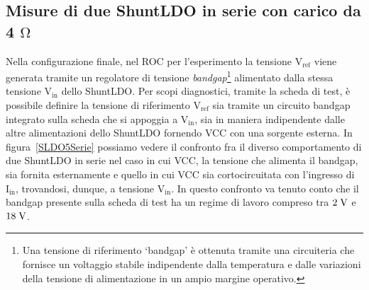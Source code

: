 \subsection{Misure di due ShuntLDO in serie con carico da 4 $\mathrm{\Omega}$}

Nella configurazione finale, nel ROC per l'esperimento la tensione $\mathrm{V_{ref}}$ viene generata tramite un regolatore di tensione {\em bandgap}\footnote{Una tensione di riferimento `bandgap' \`e ottenuta tramite una circuiteria che fornisce un voltaggio stabile indipendente dalla temperatura e dalle variazioni della tensione di alimentazione in un ampio margine operativo.} alimentato dalla stessa tensione $\mathrm{V_{in}}$ dello ShuntLDO. 
Per scopi diagnostici, tramite la scheda di test, \`e possibile definire la tensione di riferimento $\mathrm{V_{ref}}$ sia tramite un circuito bandgap integrato sulla scheda che si appoggia a $\mathrm{V_{in}}$, sia in maniera indipendente dalle altre alimentazioni dello ShuntLDO fornendo VCC con una sorgente esterna. 
In figura~\ref{SLDO5Serie} possiamo vedere il confronto fra il diverso comportamento di due ShuntLDO in serie nel caso in cui VCC, la tensione che alimenta il bandgap, sia fornita esternamente e quello in cui VCC sia cortocircuitata con l'ingresso di $\mathrm{I_{in}}$, trovandosi, dunque, a tensione $\mathrm{V_{in}}$.
In questo confronto va tenuto conto che il bandgap presente sulla scheda di test ha un regime di lavoro compreso tra $2\rm \; V$ e $18\rm \; V$. 
